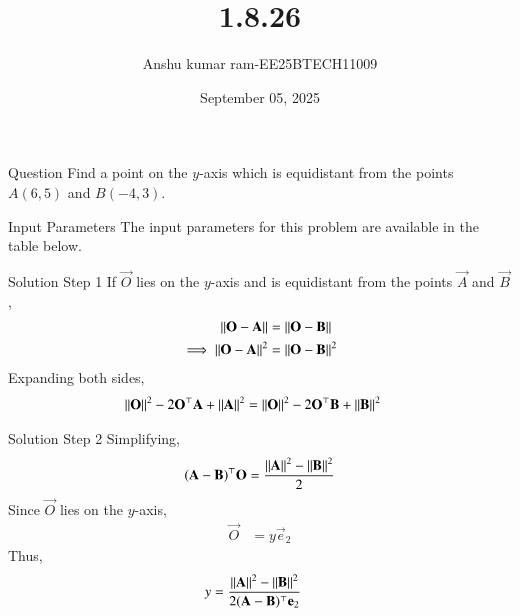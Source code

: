 \documentclass{beamer}
\title %
{1.8.26}
\date{September 05, 2025}
\author %
{Anshu kumar ram-EE25BTECH11009}
\begin{document}
\frame{\titlepage}

\begin{frame}{Question}
Find a point on the $y$-axis which is equidistant from the points $A(6,5)$ and $B(-4,3)$.
\end{frame}

\begin{frame}{Input Parameters}
The input parameters for this problem are available in the table below.
\begin{table}[H]
\centering

\caption{}
\label{table}
\end{table}
\end{frame}

\begin{frame}{Solution Step 1}
If $\vec{O}$ lies on the $y$-axis and is equidistant from the points $\vec{A}$ and $\vec{B}$,  
\begin{align}
\left\lVert\mathbf{O}-\mathbf{A}\right\rVert &= \left\lVert\mathbf{O}-\mathbf{B}\right\rVert \\
\implies \left\lVert\mathbf{O}-\mathbf{A}\right\rVert^2 &= \left\lVert\mathbf{O}-\mathbf{B}\right\rVert^2
\end{align}
Expanding both sides,  
\begin{align}
\left\lVert\mathbf{O}\right\rVert^2 - 2\mathbf{O}^\top \mathbf{A} + \left\lVert\mathbf{A}\right\rVert^2
&= \left\lVert\mathbf{O}\right\rVert^2 - 2\mathbf{O}^\top \mathbf{B} + \left\lVert\mathbf{B}\right\rVert^2
\end{align}
\end{frame}

\begin{frame}{Solution Step 2}
Simplifying,  
\begin{align}
(\mathbf{A}-\mathbf{B})^\top \mathbf{O}
= \frac{\left\lVert\mathbf{A}\right\rVert^2 - \left\lVert\mathbf{B}\right\rVert^2}{2}
\end{align}
Since $\vec{O}$ lies on the $y$-axis,  
\begin{align}
\vec{O} &= y \vec{e}_2
\end{align}
Thus,  
\begin{align}
y &= \frac{\left\lVert\mathbf{A}\right\rVert^2 - \left\lVert\mathbf{B}\right\rVert^2}{2(\mathbf{A}-\mathbf{B})^\top \mathbf{e}_2}
\end{align}
\end{frame}
\end{document}
